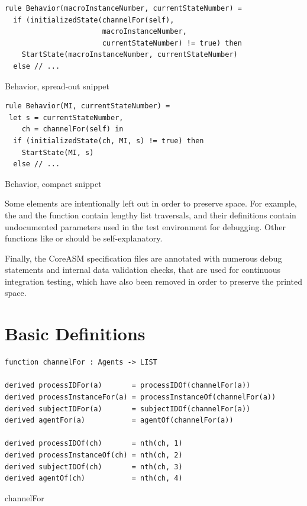 \begin{listing}[H]
\begin{verbatim}
rule Behavior(macroInstanceNumber, currentStateNumber) =
  if (initializedState(channelFor(self),
                       macroInstanceNumber,
                       currentStateNumber) != true) then
    StartState(macroInstanceNumber, currentStateNumber)
  else // ...
\end{verbatim}
\caption{Behavior, spread-out snippet}
\label{lst:asm:Behavior_snipped_spread-out}
\end{listing}

\begin{listing}[H]
\begin{verbatim}
rule Behavior(MI, currentStateNumber) =
 let s = currentStateNumber,
    ch = channelFor(self) in
  if (initializedState(ch, MI, s) != true) then
    StartState(MI, s)
  else // ...
\end{verbatim}
\caption{Behavior, compact snippet}
\label{lst:asm:Behavior_snipped_compact}
\end{listing}




Some elements are intentionally left out in order to preserve space.
For example, the  and
the  function
contain lengthy list traversals, and their definitions contain
undocumented parameters used in the test environment for debugging.
Other functions like  or  should be self-explanatory.

Finally, the CoreASM specification files are annotated with numerous debug statements and internal data validation checks,
that are used for continuous integration testing, which have also been removed in order to preserve the printed space.



\newpage
\section{Basic Definitions}

\begin{listing}[H]
\begin{verbatim}
function channelFor : Agents -> LIST

derived processIDFor(a)       = processIDOf(channelFor(a))
derived processInstanceFor(a) = processInstanceOf(channelFor(a))
derived subjectIDFor(a)       = subjectIDOf(channelFor(a))
derived agentFor(a)           = agentOf(channelFor(a))

derived processIDOf(ch)       = nth(ch, 1)
derived processInstanceOf(ch) = nth(ch, 2)
derived subjectIDOf(ch)       = nth(ch, 3)
derived agentOf(ch)           = nth(ch, 4)
\end{verbatim}
\caption{channelFor}
\label{lst:asm:channelFor}
\end{listing}


